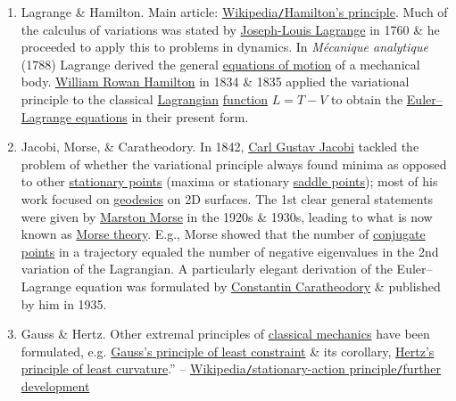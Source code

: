\documentclass{article}
\begin{document}
\begin{enumerate}
	\item {\sc Lagrange \& Hamilton.} Main article: \href{https://en.wikipedia.org/wiki/Hamilton%27s_principle}{Wikipedia{\tt/}Hamilton's principle}. Much of the calculus of variations was stated by \href{https://en.wikipedia.org/wiki/Joseph-Louis_Lagrange}{Joseph-Louis Lagrange} in 1760 \& he proceeded to apply this to problems in dynamics. In \textit{M\'ecanique analytique} (1788) Lagrange derived the general \href{https://en.wikipedia.org/wiki/Lagrangian_equations_of_motion}{equations of motion} of a mechanical body. \href{https://en.wikipedia.org/wiki/William_Rowan_Hamilton}{William Rowan Hamilton} in 1834 \& 1835 applied the variational principle to the classical \href{https://en.wikipedia.org/wiki/Lagrangian_mechanics}{Lagrangian} \href{https://en.wikipedia.org/wiki/Function_(mathematics)}{function} $L = T - V$ to obtain the \href{https://en.wikipedia.org/wiki/Euler%E2%80%93Lagrange_equations}{Euler--Lagrange equations} in their present form.
	\item {\sc Jacobi, Morse, \& Caratheodory.} In 1842, \href{https://en.wikipedia.org/wiki/Carl_Gustav_Jacobi}{Carl Gustav Jacobi} tackled the problem of whether the variational principle always found minima as opposed to other \href{https://en.wikipedia.org/wiki/Stationary_points}{stationary points} (maxima or stationary \href{https://en.wikipedia.org/wiki/Saddle_points}{saddle points}); most of his work focused on \href{https://en.wikipedia.org/wiki/Geodesics}{geodesics} on 2D surfaces. The 1st clear general statements were given by \href{https://en.wikipedia.org/wiki/Marston_Morse}{Marston Morse} in the 1920s \& 1930s, leading to what is now known as \href{https://en.wikipedia.org/wiki/Morse_theory}{Morse theory}. E.g., Morse showed that the number of \href{https://en.wikipedia.org/wiki/Conjugate_points}{conjugate points} in a trajectory equaled the number of negative eigenvalues in the 2nd variation of the Lagrangian. A particularly elegant derivation of the Euler--Lagrange equation was formulated by \href{https://en.wikipedia.org/wiki/Constantin_Caratheodory}{Constantin Caratheodory} \& published by him in 1935.
	\item {\sc Gauss \& Hertz.} Other extremal principles of \href{https://en.wikipedia.org/wiki/Classical_mechanics}{classical mechanics} have been formulated, e.g. \href{https://en.wikipedia.org/wiki/Gauss%27s_principle_of_least_constraint}{Gauss's principle of least constraint} \& its corollary, \href{https://en.wikipedia.org/wiki/Hertz%27s_principle_of_least_curvature}{Hertz's principle of least curvature}.'' -- \href{https://en.wikipedia.org/wiki/Stationary-action_principle#Further_development}{Wikipedia{\tt/}stationary-action principle{\tt/}further development}
\end{enumerate}
\end{document}
